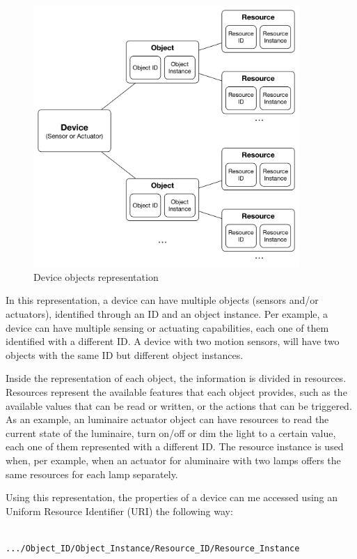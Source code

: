 \begin{figure}[H]
	\centering
	\includegraphics[width=0.9\textwidth]{figures/obj.png}
	\caption{Device objects representation}
	\label{fig:obj}
\end{figure}

In this representation, a device can have multiple objects (sensors and/or actuators), identified through an ID and an object instance. Per example, a device can have multiple sensing or actuating capabilities, each one of them identified with a different ID. A device with two motion sensors, will have two objects with the same ID but different object instances. 

Inside the representation of each object, the information is divided in resources. Resources represent the available features that each object provides, such as the available values that can be read or written, or the actions that can be triggered. As an example, an luminaire actuator object can have resources to read the current state of the luminaire, turn  on/off or dim the light to a certain value, each one of them represented with a different ID. The resource instance is used when, per example, when an actuator for aluminaire with two lamps offers the same resources for each lamp separately.

Using this representation, the properties of a device can me accessed using an Uniform Resource Identifier (URI) the following way: 


\begin{verbatim}

.../Object_ID/Object_Instance/Resource_ID/Resource_Instance
	

\end{verbatim}
	
